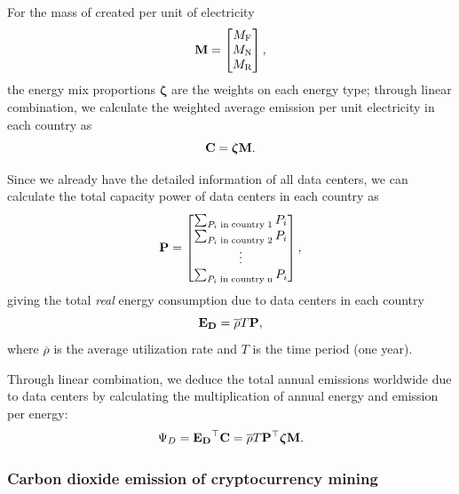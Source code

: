 \documentclass[12pt]{article}
\begin{document}
For the mass of  created per unit of electricity
\begin{equation}
	\vb{M} = \begin{bmatrix}
		M_{\rm F} \\
		M_{\rm N} \\
		M_{\rm R} \\
	\end{bmatrix},
\end{equation}
the energy mix proportions $\boldsymbol{\zeta}$ are the weights on each energy type; through linear combination, we calculate the weighted average  emission per unit electricity in each country as
\begin{equation}
	\vb{C} = \boldsymbol{\zeta} \vb{M}.
\end{equation}

Since we already have the detailed information of all data centers, we can calculate the total capacity power of data centers in each country as
\begin{equation}
	\vb{P} = \begin{bmatrix}
		\sum_{P_i \rm\;in\;country\;1} P_i \\
		\sum_{P_i \rm\;in\;country\;2} P_i \\
		\vdots \\
		\sum_{P_i \rm\;in\;country\;n} P_i \\
	\end{bmatrix},
\end{equation}
giving the total \textit{real} energy consumption due to data centers in each country
\begin{equation}
	\vb{E_D} = \overline{\rho} T \vb{P},
\end{equation}
where $\overline{\rho}$ is the average utilization rate and $T$ is the time period (one year).

Through linear combination, we deduce the total annual  emissions worldwide due to data centers by calculating the multiplication of annual energy and  emission per energy:
\begin{equation}
	\Psi_D = \vb{E_D}^\top \vb{C} = \overline{\rho} T \vb{P}^\top \boldsymbol{\zeta} \vb{M}.
	\label{eq_dc_emission}
\end{equation}

\subsubsection{Carbon dioxide emission of cryptocurrency mining}
\end{document}
